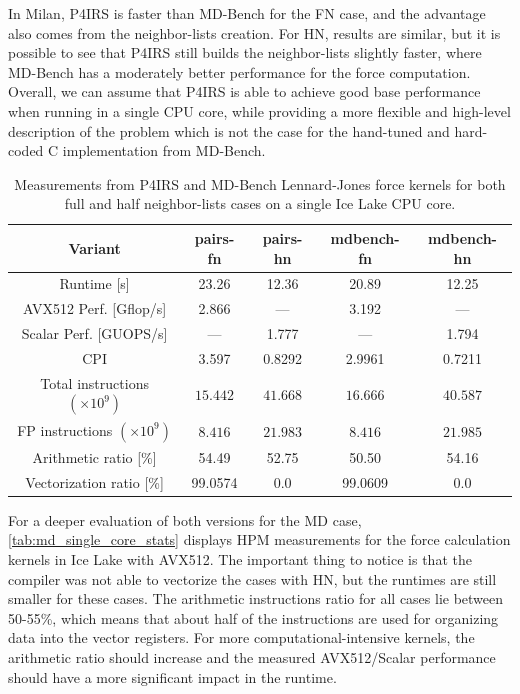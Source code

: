 \documentclass[preprint,12pt]{elsarticle}
\newcommand{\second}{\mbox{s}}
\newcommand{\seconds}{\mbox{s}}
\newcommand{\flop}{\mbox{flop}}
\newcommand{\GFS}{\mbox{G\flop/\second}}
\begin{document}
In Milan, P4IRS is faster than MD-Bench for the \ac{FN} case, and the advantage also comes from the neighbor-lists creation.
For \ac{HN}, results are similar, but it is possible to see that P4IRS still builds the neighbor-lists slightly faster, where MD-Bench has a moderately better performance for the force computation.
Overall, we can assume that P4IRS is able to achieve good base performance when running in a single CPU core, while providing a more flexible and high-level description of the problem which is not the case for the hand-tuned and hard-coded C implementation from MD-Bench.

\begin{table}[htb]
    \centering
    \begin{tabular}{c|c|c|c|c}
        Variant & pairs-fn & pairs-hn & mdbench-fn & mdbench-hn \\
        \hline
        Runtime [\seconds] & 23.26 & 12.36 & 20.89 & 12.25 \\
        AVX512 Perf. [\GFS] & 2.866 & --- & 3.192 & --- \\
        Scalar Perf. [GUOPS/s] & --- & 1.777 & --- & 1.794 \\
        CPI & 3.597 & 0.8292 & 2.9961 & 0.7211 \\
        Total instructions $(\times 10^9)$ & $15.442$ & $41.668$ & $16.666$ & $40.587$ \\
        FP instructions $(\times 10^9)$ & $8.416$ & $21.983$ & $8.416$ & $21.985$ \\
        Arithmetic ratio [\%] & 54.49 & 52.75 & 50.50 & 54.16 \\
        Vectorization ratio [\%] & 99.0574 & 0.0 & 99.0609 & 0.0 \\
    \end{tabular}
    \caption{Measurements from P4IRS and MD-Bench Lennard-Jones force kernels for both full and half neighbor-lists cases on a single Ice Lake CPU core.}
    \label{tab:md_single_core_stats}
\end{table}

For a deeper evaluation of both versions for the \ac{MD} case, \autoref{tab:md_single_core_stats} displays HPM measurements for the force calculation kernels in Ice Lake with AVX512.
The important thing to notice is that the compiler was not able to vectorize the cases with \ac{HN}, but the runtimes are still smaller for these cases.
The arithmetic instructions ratio for all cases lie between 50-55\%, which means that about half of the instructions are used for organizing data into the vector registers.
For more computational-intensive kernels, the arithmetic ratio should increase and the measured AVX512/Scalar performance should have a more significant impact in the runtime.
\end{document}
